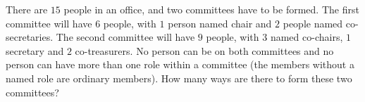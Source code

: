 There are $15$ people in an office, and two committees have to be formed. The first committee will have $6$ people, with $1$ person named chair and $2$ people named co-secretaries. The second committee will have $9$ people, with $3$ named co-chairs, $1$ secretary and $2$ co-treasurers. No person can be on both committees and no person can have more than one role within a committee (the members without a named role are ordinary members). How many ways are there to form these two committees?
